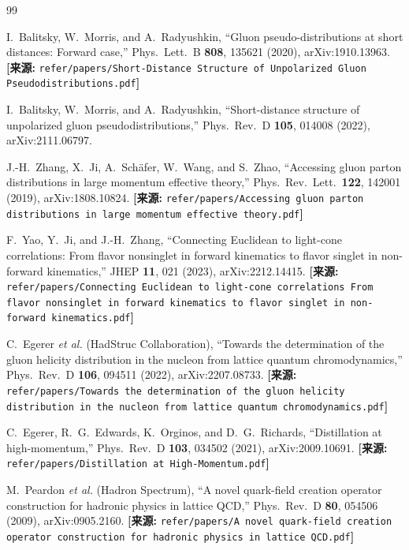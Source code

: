 \documentclass[12pt,a4paper]{ctexart}
\theoremstyle{definition}
\begin{document}
\begin{thebibliography}{99}

I.~Balitsky, W.~Morris, and A.~Radyushkin,
``Gluon pseudo-distributions at short distances: Forward case,''
Phys.\ Lett.\ B \textbf{808}, 135621 (2020), arXiv:1910.13963.
\quad\textbf{[来源:} \texttt{refer/papers/Short-Distance Structure of Unpolarized Gluon Pseudodistributions.pdf}\textbf{]}

I.~Balitsky, W.~Morris, and A.~Radyushkin,
``Short-distance structure of unpolarized gluon pseudodistributions,''
Phys.\ Rev.\ D \textbf{105}, 014008 (2022), arXiv:2111.06797.

J.-H.~Zhang, X.~Ji, A.~Sch\"afer, W.~Wang, and S.~Zhao,
``Accessing gluon parton distributions in large momentum effective theory,''
Phys.\ Rev.\ Lett.\ \textbf{122}, 142001 (2019), arXiv:1808.10824.
\quad\textbf{[来源:} \texttt{refer/papers/Accessing gluon parton distributions in large momentum effective theory.pdf}\textbf{]}


F.~Yao, Y.~Ji, and J.-H.~Zhang,
``Connecting Euclidean to light-cone correlations: From flavor nonsinglet in forward kinematics to flavor singlet in non-forward kinematics,''
JHEP \textbf{11}, 021 (2023), arXiv:2212.14415.
\quad\textbf{[来源:} \texttt{refer/papers/Connecting Euclidean to light-cone correlations From flavor nonsinglet in forward kinematics to flavor singlet in non-forward kinematics.pdf}\textbf{]}


C.~Egerer \textit{et al.} (HadStruc Collaboration),
``Towards the determination of the gluon helicity distribution in the nucleon from lattice quantum chromodynamics,''
Phys.\ Rev.\ D \textbf{106}, 094511 (2022), arXiv:2207.08733.
\quad\textbf{[来源:} \texttt{refer/papers/Towards the determination of the gluon helicity distribution in the nucleon from lattice quantum chromodynamics.pdf}\textbf{]}

C.~Egerer, R.~G.~Edwards, K.~Orginos, and D.~G.~Richards,
``Distillation at high-momentum,''
Phys.\ Rev.\ D \textbf{103}, 034502 (2021), arXiv:2009.10691.
\quad\textbf{[来源:} \texttt{refer/papers/Distillation at High-Momentum.pdf}\textbf{]}

M.~Peardon \textit{et al.} (Hadron Spectrum),
``A novel quark-field creation operator construction for hadronic physics in lattice QCD,''
Phys.\ Rev.\ D \textbf{80}, 054506 (2009), arXiv:0905.2160.
\quad\textbf{[来源:} \texttt{refer/papers/A novel quark-field creation operator construction for hadronic physics in lattice QCD.pdf}\textbf{]}


\end{thebibliography}
\end{document}
